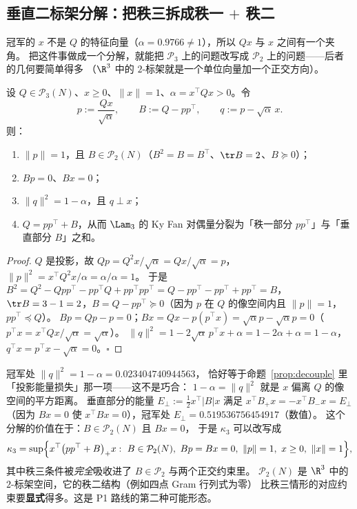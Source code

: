 \subsection{垂直二标架分解：把秩三拆成秩一 $+$ 秩二}\label{sec:perp2}

冠军的 $x$ 不是 $Q$ 的特征向量（$\alpha=0.9766\ne1$），所以 $Qx$ 与 $x$ 之间有一个夹角。
把这件事做成一个分解，就能把 $\mathcal P_3$ 上的问题改写成 $\mathcal P_2$ 上的问题——后者的几何要简单得多
（$\R^3$ 中的 $2$-标架就是一个单位向量加一个正交方向）。

\begin{lemma}[垂直二标架分解，已证]\label{lem:perp2}
设 $Q\in\mathcal P_3(N)$、$x\ge0$、$\|x\|=1$、$\alpha=x^\top Qx>0$。令
\[
p:=\frac{Qx}{\sqrt\alpha},\qquad B:=Q-pp^\top,\qquad q:=p-\sqrt\alpha\,x .
\]
则：
\begin{enumerate}[label=(\roman*),leftmargin=2.2em]
\item $\|p\|=1$，且 $B\in\mathcal P_2(N)$（$B^2=B=B^\top$、$\tr B=2$、$B\succeq0$）；
\item $Bp=0$、$Bx=0$；
\item $\|q\|^2=1-\alpha$，且 $q\perp x$；
\item $Q=pp^\top+B$，从而 $\Lam_3$ 的 Ky Fan 对偶量分裂为「秩一部分 $pp^\top$」与「垂直部分 $B$」之和。
\end{enumerate}
\end{lemma}

\begin{proof}
$Q$ 是投影，故 $Qp=Q^2x/\sqrt\alpha=Qx/\sqrt\alpha=p$，$\|p\|^2=x^\top Q^2x/\alpha=\alpha/\alpha=1$。
于是 $B^2=Q^2-Qpp^\top-pp^\top Q+pp^\top pp^\top=Q-pp^\top-pp^\top+pp^\top=B$，
$\tr B=3-1=2$，$B=Q-pp^\top\succeq0$（因为 $p$ 在 $Q$ 的像空间内且 $\|p\|=1$，$pp^\top\preceq Q$）。
$Bp=Qp-p=0$；$Bx=Qx-p(p^\top x)=\sqrt\alpha p-\sqrt\alpha p=0$（$p^\top x=x^\top Qx/\sqrt\alpha=\sqrt\alpha$）。
$\|q\|^2=1-2\sqrt\alpha\,p^\top x+\alpha=1-2\alpha+\alpha=1-\alpha$，$q^\top x=p^\top x-\sqrt\alpha=0$。$\square$
\end{proof}

\begin{remark}[冠军处的分裂，精确/数值]\label{rmk:perp2read}
冠军处 $\|q\|^2=1-\alpha=0.023404740944563$，
恰好等于命题~\ref{prop:decouple} 里「投影能量损失」那一项——这不是巧合：
$1-\alpha=\|q\|^2$ 就是 $x$ 偏离 $Q$ 的像空间的平方距离。
垂直部分的能量 $E_\perp:=\tfrac12x^\top|B|x$ 满足 $x^\top B_+x=-x^\top B_-x=E_\perp$
（因为 $Bx=0$ 使 $x^\top Bx=0$），冠军处 $E_\perp=0.519536756454917$（数值）。
这个分解的价值在于：$B\in\mathcal P_2(N)$ 且 $Bx=0$，
于是 $\kappa_3$ 可以改写成
\[
\kappa_3=\sup\Bigl\{x^\top\bigl(pp^\top+B\bigr)_+x:\ B\in\mathcal P_2(N),\ Bp=Bx=0,\ \|p\|=1,\ x\ge0,\ \|x\|=1\Bigr\},
\]
其中秩三条件被\emph{完全}吸收进了 $B\in\mathcal P_2$ 与两个正交约束里。
$\mathcal P_2(N)$ 是 $\R^3$ 中的 $2$-标架空间，它的秩二结构（例如四点 Gram 行列式为零）
比秩三情形的对应约束要\textbf{显式}得多。这是 P1 路线的第二种可能形态。
\end{remark}

